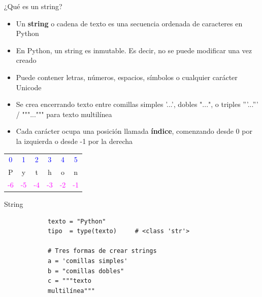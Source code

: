 \documentclass{beamer}
\begin{document}
    \begin{frame}{¿Qué es un string?}
        \begin{itemize}
            \item Un \textbf{string} o cadena de texto es una secuencia ordenada de caracteres en Python
            \item En Python, un string es inmutable. Es decir, no se puede modificar una vez creado
            \item Puede contener letras, números, espacios, símbolos o cualquier carácter Unicode
            \item Se crea encerrando texto entre comillas simples '...', dobles "...", o triples '''...''' / """...""" para texto multilínea
            \item Cada carácter ocupa una posición llamada \textbf{índice}, comenzando desde 0 por la izquierda o desde -1 por la derecha
        \end{itemize}
        \centering

        \Large
        \begin{tabular}{c c c c c c}
        \textcolor{blue}{0} & \textcolor{blue}{1} & \textcolor{blue}{2} & \textcolor{blue}{3} & \textcolor{blue}{4} & \textcolor{blue}{5} \\
        P & y & t & h & o & n \\
        \textcolor{magenta}{-6} & \textcolor{magenta}{-5} & \textcolor{magenta}{-4} & \textcolor{magenta}{-3} & \textcolor{magenta}{-2} & \textcolor{magenta}{-1}
        \end{tabular}
    \end{frame}

    \begin{frame}[fragile,t]{String}
        \begin{verbatim}
            texto = "Python"
            tipo  = type(texto)     # <class 'str'>
            
            # Tres formas de crear strings
            a = 'comillas simples'
            b = "comillas dobles"
            c = """texto
            multilínea"""
        \end{verbatim}
    \end{frame}    
\end{document}
